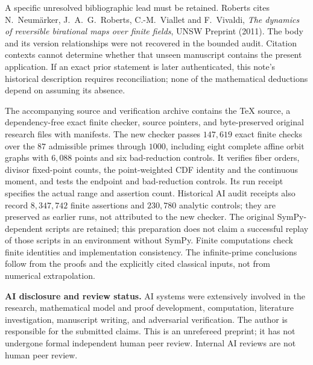 \documentclass[11pt]{article}
\theoremstyle{remark}
\begin{document}
A specific unresolved bibliographic lead must be retained.
Roberts \cite[p.220, reference 9]{R} cites N.~Neum\"arker,
J.~A.~G.~Roberts, C.-M.~Viallet and F.~Vivaldi,
\emph{The dynamics of reversible birational maps over finite fields},
UNSW Preprint (2011). The body and its version relationships were
not recovered in the bounded audit. Citation contexts cannot
determine whether that unseen manuscript contains the present
application. If an exact prior statement is later authenticated,
this note's historical description requires reconciliation; none
of the mathematical deductions depend on assuming its absence.

The accompanying source and verification archive contains the TeX
source, a dependency-free exact finite checker, source pointers,
and byte-preserved original research files with manifests. The
new checker passes $147{,}619$ exact finite checks over the $87$
admissible primes through $1000$, including eight complete affine orbit
graphs with $6{,}088$ points and six bad-reduction controls. It verifies
fiber orders, divisor fixed-point counts, the
point-weighted CDF identity and the continuous moment, and tests
the endpoint and bad-reduction controls. Its run receipt specifies
the actual range and assertion count. Historical AI audit receipts
also record $8{,}347{,}742$ finite assertions and $230{,}780$ analytic
controls; they are preserved as earlier runs, not attributed to the
new checker. The original SymPy-dependent scripts are retained;
this preparation does not claim a successful replay of those scripts
in an environment without SymPy. Finite computations check finite
identities and implementation consistency. The infinite-prime
conclusions follow from the proofs and the explicitly cited
classical inputs, not from numerical extrapolation.

\medskip\noindent\textbf{AI disclosure and review status.}
AI systems were extensively involved in the research, mathematical
model and proof development, computation, literature investigation,
manuscript writing, and adversarial verification. The author is
responsible for the submitted claims. This is an unrefereed preprint;
it has not undergone formal independent human peer review.
Internal AI reviews are not human peer review.
\end{document}
